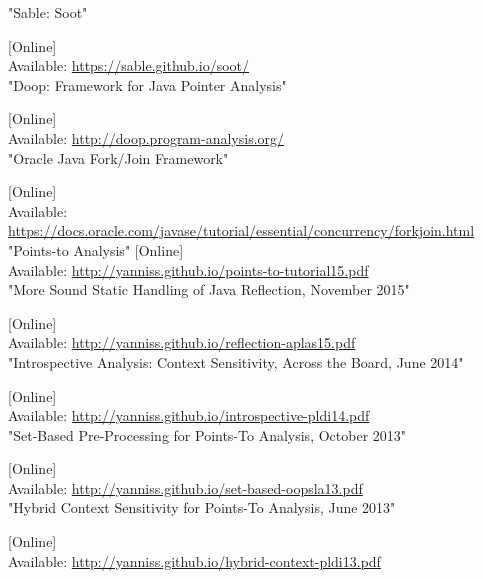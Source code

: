 \documentclass{dithesis}
\begin{document}
\begin{thesisbibliography}[References]{99}
        "Sable: Soot"

        [Online] \\ Available: \url{https://sable.github.io/soot/} \\
		"Doop: Framework for Java Pointer Analysis"

        [Online] \\ Available: \url{http://doop.program-analysis.org/} \\
        "Oracle Java Fork/Join Framework"

        [Online] \\ Available: \url{https://docs.oracle.com/javase/tutorial/essential/concurrency/forkjoin.html} \\
        "Points-to Analysis"
        [Online] \\ Available: \url{http://yanniss.github.io/points-to-tutorial15.pdf} \\
        "More Sound Static Handling of Java Reflection, November 2015"

        [Online] \\ Available: \url{http://yanniss.github.io/reflection-aplas15.pdf} \\
        "Introspective Analysis: Context Sensitivity, Across the Board, June 2014"

        [Online] \\ Available: \url{http://yanniss.github.io/introspective-pldi14.pdf} \\
        "Set-Based Pre-Processing for Points-To Analysis, October 2013"

        [Online] \\ Available: \url{http://yanniss.github.io/set-based-oopsla13.pdf} \\
        "Hybrid Context Sensitivity for Points-To Analysis, June 2013"

        [Online] \\ Available: \url{http://yanniss.github.io/hybrid-context-pldi13.pdf} \\
\end{thesisbibliography}
\end{document}
